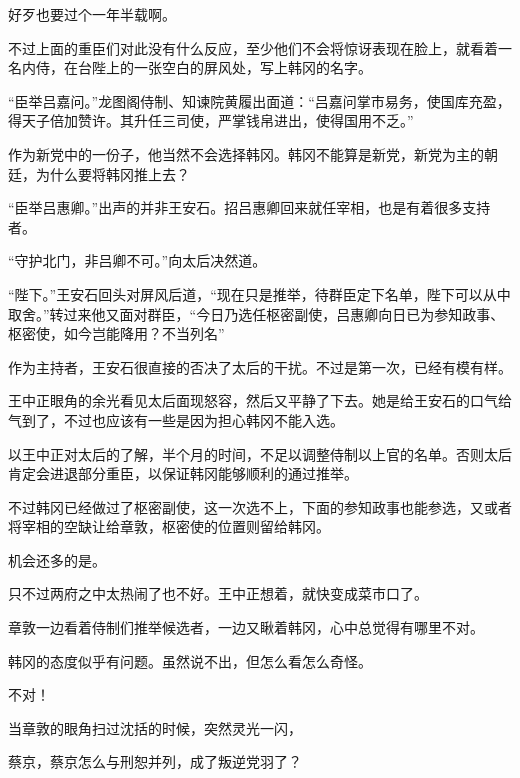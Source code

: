 好歹也要过个一年半载啊。

不过上面的重臣们对此没有什么反应，至少他们不会将惊讶表现在脸上，就看着一名内侍，在台陛上的一张空白的屏风处，写上韩冈的名字。

“臣举吕嘉问。”龙图阁侍制、知谏院黄履出面道：“吕嘉问掌市易务，使国库充盈，得天子倍加赞许。其升任三司使，严掌钱帛进出，使得国用不乏。”

作为新党中的一份子，他当然不会选择韩冈。韩冈不能算是新党，新党为主的朝廷，为什么要将韩冈推上去？

“臣举吕惠卿。”出声的并非王安石。招吕惠卿回来就任宰相，也是有着很多支持者。

“守护北门，非吕卿不可。”向太后决然道。

“陛下。”王安石回头对屏风后道，“现在只是推举，待群臣定下名单，陛下可以从中取舍。”转过来他又面对群臣，“今日乃选任枢密副使，吕惠卿向日已为参知政事、枢密使，如今岂能降用？不当列名”

作为主持者，王安石很直接的否决了太后的干扰。不过是第一次，已经有模有样。

王中正眼角的余光看见太后面现怒容，然后又平静了下去。她是给王安石的口气给气到了，不过也应该有一些是因为担心韩冈不能入选。

以王中正对太后的了解，半个月的时间，不足以调整侍制以上官的名单。否则太后肯定会进退部分重臣，以保证韩冈能够顺利的通过推举。

不过韩冈已经做过了枢密副使，这一次选不上，下面的参知政事也能参选，又或者将宰相的空缺让给章敦，枢密使的位置则留给韩冈。

机会还多的是。

只不过两府之中太热闹了也不好。王中正想着，就快变成菜市口了。

章敦一边看着侍制们推举候选者，一边又瞅着韩冈，心中总觉得有哪里不对。

韩冈的态度似乎有问题。虽然说不出，但怎么看怎么奇怪。

不对！

当章敦的眼角扫过沈括的时候，突然灵光一闪，

蔡京，蔡京怎么与刑恕并列，成了叛逆党羽了？


